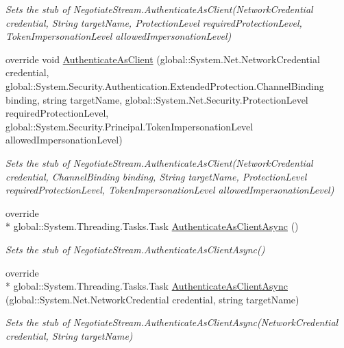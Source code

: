 \begin{DoxyCompactItemize}
\begin{DoxyCompactList}\small\item\em Sets the stub of Negotiate\-Stream.\-Authenticate\-As\-Client(\-Network\-Credential credential, String target\-Name, Protection\-Level required\-Protection\-Level, Token\-Impersonation\-Level allowed\-Impersonation\-Level)\end{DoxyCompactList}\item 
override void \hyperlink{class_system_1_1_net_1_1_security_1_1_fakes_1_1_stub_negotiate_stream_af4ae1149638f22e98b375636d1ab0ada}{Authenticate\-As\-Client} (global\-::\-System.\-Net.\-Network\-Credential credential, global\-::\-System.\-Security.\-Authentication.\-Extended\-Protection.\-Channel\-Binding binding, string target\-Name, global\-::\-System.\-Net.\-Security.\-Protection\-Level required\-Protection\-Level, global\-::\-System.\-Security.\-Principal.\-Token\-Impersonation\-Level allowed\-Impersonation\-Level)
\begin{DoxyCompactList}\small\item\em Sets the stub of Negotiate\-Stream.\-Authenticate\-As\-Client(\-Network\-Credential credential, Channel\-Binding binding, String target\-Name, Protection\-Level required\-Protection\-Level, Token\-Impersonation\-Level allowed\-Impersonation\-Level)\end{DoxyCompactList}\item 
override \\*
global\-::\-System.\-Threading.\-Tasks.\-Task \hyperlink{class_system_1_1_net_1_1_security_1_1_fakes_1_1_stub_negotiate_stream_aa88fc237685de8fb59e62ded0c53bd7f}{Authenticate\-As\-Client\-Async} ()
\begin{DoxyCompactList}\small\item\em Sets the stub of Negotiate\-Stream.\-Authenticate\-As\-Client\-Async()\end{DoxyCompactList}\item 
override \\*
global\-::\-System.\-Threading.\-Tasks.\-Task \hyperlink{class_system_1_1_net_1_1_security_1_1_fakes_1_1_stub_negotiate_stream_ae84dbf408b7d68a45d8665819e1af11a}{Authenticate\-As\-Client\-Async} (global\-::\-System.\-Net.\-Network\-Credential credential, string target\-Name)
\begin{DoxyCompactList}\small\item\em Sets the stub of Negotiate\-Stream.\-Authenticate\-As\-Client\-Async(\-Network\-Credential credential, String target\-Name)\end{DoxyCompactList}\item 

\end{DoxyCompactItemize}
